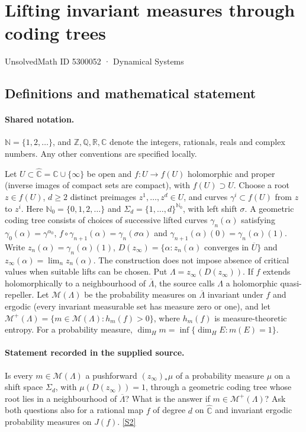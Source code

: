 \documentclass[11pt]{article}
\newcommand{\sref}[2]{\hyperlink{source:#1:#2}{[S#2]}}
\begin{document}
\setcounter{section}{5300051}
\section{Lifting invariant measures through coding trees}\label{5300052}
{\small\sffamily UnsolvedMath ID 5300052 · Dynamical Systems}
\subsection{Definitions and mathematical statement}

\paragraph{Shared notation.}$\mathbb N=\{1,2,\ldots\}$, and $\mathbb Z,\mathbb Q,\mathbb R,\mathbb C$ denote the integers, rationals, reals and complex numbers. Any other conventions are specified locally.


Let $U\subset\widehat{\mathbb C}=\mathbb C\cup\{\infty\}$ be open and $f:U\to f(U)$ holomorphic and proper (inverse images of compact sets are compact), with $f(U)\supset U$. Choose a root $z\in f(U)$, $d\geq2$ distinct preimages $z^1,\ldots,z^d\in U$, and curves $\gamma^i\subset f(U)$ from $z$ to $z^i$. Here $\mathbb N_0=\{0,1,2,\ldots\}$ and $\Sigma_d=\{1,\ldots,d\}^{\mathbb N_0}$, with left shift $\sigma$. A geometric coding tree consists of choices of successive lifted curves $\gamma_n(\alpha)$ satisfying $\gamma_0(\alpha)=\gamma^{\alpha_0}$, $f\circ\gamma_{n+1}(\alpha)=\gamma_n(\sigma\alpha)$ and $\gamma_{n+1}(\alpha)(0)=\gamma_n(\alpha)(1)$. Write $z_n(\alpha)=\gamma_n(\alpha)(1)$, $D(z_\infty)=\{\alpha:z_n(\alpha)\text{ converges in }\overline U\}$ and $z_\infty(\alpha)=\lim_n z_n(\alpha)$. The construction does not impose absence of critical values when suitable lifts can be chosen. Put $\Lambda=z_\infty(D(z_\infty))$. If $f$ extends holomorphically to a neighbourhood of $\overline\Lambda$, the source calls $\Lambda$ a holomorphic quasi-repeller. Let $\mathcal M(\Lambda)$ be the probability measures on $\overline\Lambda$ invariant under $f$ and ergodic (every invariant measurable set has measure zero or one), and let $\mathcal M^+(\Lambda)=\{m\in\mathcal M(\Lambda):h_m(f)>0\}$, where $h_m(f)$ is measure-theoretic entropy. For a probability measure, $\dim_Hm=\inf\{\dim_HE:m(E)=1\}$.
\paragraph{Statement recorded in the supplied source.}
Is every $m\in\mathcal M(\Lambda)$ a pushforward $(z_\infty)_*\mu$ of a probability measure $\mu$ on a shift space $\Sigma_d$, with $\mu(D(z_\infty))=1$, through a geometric coding tree whose root lies in a neighbourhood of $\overline\Lambda$? What is the answer if $m\in\mathcal M^+(\Lambda)$? Ask both questions also for a rational map $f$ of degree $d$ on $\widehat{\mathbb C}$ and invariant ergodic probability measures on $J(f)$. \sref{5300052}{2}
\end{document}
